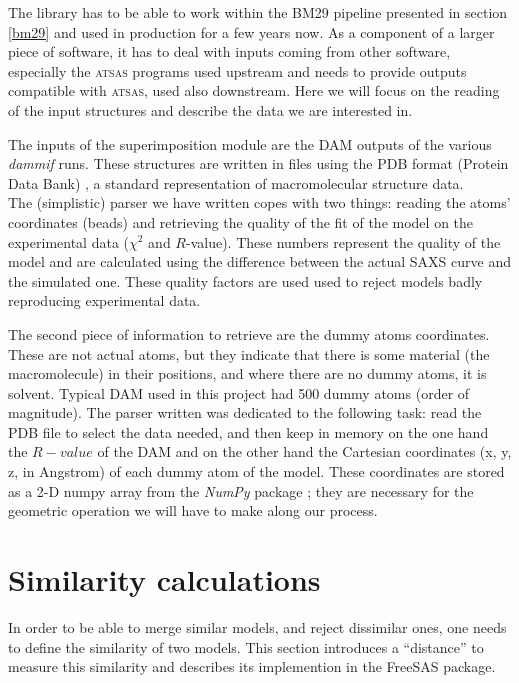 \documentclass[a4paper, 11pt]{report}
\begin{document}
The library has to be able to work within the BM29 pipeline presented 
in section \ref{bm29} and used in production for a few years  now. 
As a component of a larger piece of software, it has to deal with 
inputs coming from other software, especially the \textsc{atsas} 
programs used upstream and needs to provide outputs compatible with 
\textsc{atsas}, used also downstream. 
Here we will focus on the reading of the input structures and describe the
data we are interested in.

The inputs of the superimposition module are the DAM outputs of the 
various \textit{dammif} runs. 
These structures are written in files using the PDB format (Protein 
Data Bank) \cite{pdb}, a standard representation of macromolecular 
structure data.\\
The (simplistic) parser we have written copes with two things: reading 
the atoms' coordinates (beads) and retrieving the quality of the fit 
of the model on the experimental data ($\chi^2$ and $R$-value). 
These numbers represent the quality of the model and are calculated 
using the difference between the actual SAXS curve and the simulated 
one. 
These quality factors are used used to reject models badly reproducing 
experimental data.

The second piece of information to retrieve are the dummy atoms 
coordinates. 
These are not actual atoms, but they indicate that there is some 
material (the macromolecule) in their positions, and where there are 
no dummy atoms, it is solvent. 
Typical DAM used in this project had 500 dummy atoms (order of 
magnitude). 
The parser written was dedicated to the following task: read the PDB 
file to select the data needed, and then keep in memory on the one 
hand the $R-value$ of the DAM and on the other hand the Cartesian 
coordinates (x, y, z, in Angstrom) of each dummy atom of the model. 
These coordinates are stored as a 2-D numpy array from the 
\textit{NumPy} package \cite{numpy}; they are necessary for the 
geometric operation we will have to make along our process.

\section{Similarity calculations}

In order to be able to merge similar models, and reject dissimilar 
ones, one needs to define the similarity of two models. 
This section introduces a ``distance'' to measure this  
similarity and describes its implemention in the FreeSAS
package.
\end{document}
